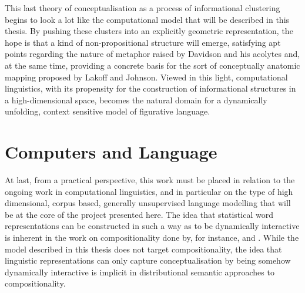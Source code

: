 This last theory of conceptualisation as a process of informational clustering begins to look a lot like the computational model that will be described in this thesis.  By pushing these clusters into an explicitly geometric representation, the hope is that a kind of non-propositional structure will emerge, satisfying apt points regarding the nature of metaphor raised by Davidson and his acolytes and, at the same time, providing a concrete basis for the sort of conceptually anatomic mapping proposed by Lakoff and Johnson.  Viewed in this light, computational linguistics, with its propensity for the construction of informational structures in a high-dimensional space, becomes the natural domain for a dynamically unfolding, context sensitive model of figurative language.

\section{Computers and Language}
At last, from a practical perspective, this work must be placed in relation to the ongoing work in computational linguistics, and in particular on the type of high dimensional, corpus based, generally unsupervised language modelling that will be at the core of the project presented here.  The idea that statistical word representations can be constructed in such a way as to be dynamically interactive is inherent in the work on compositionality done by, for instance, \cite{CoeckeEA2011} and \cite{GreffenstetteEA2011} \citep[see][for an overview]{MitchellEA2010}.  While the model described in this thesis does not target compositionality, the idea that linguistic representations can only capture conceptualisation by being somehow dynamically interactive is implicit in distributional semantic approaches to compositionality.

